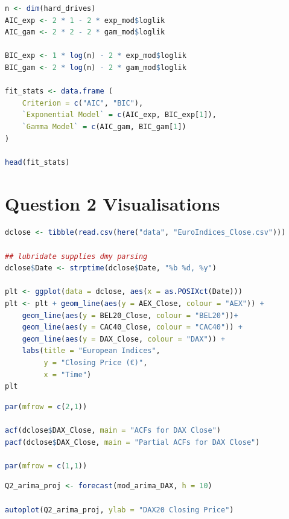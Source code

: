 \documentclass[a4paper]{article}
\begin{document}
\begin{lstlisting}[language=r,label=lst:org74350aa,caption={AIC and BIC information for models},captionpos=b,numbers=none]
n <- dim(hard_drives) 
AIC_exp <- 2 * 1 - 2 * exp_mod$loglik
AIC_gam <- 2 * 2 - 2 * gam_mod$loglik

BIC_exp <- 1 * log(n) - 2 * exp_mod$loglik
BIC_gam <- 2 * log(n) - 2 * gam_mod$loglik

fit_stats <- data.frame (
    Criterion = c("AIC", "BIC"),
    `Exponential Model` = c(AIC_exp, BIC_exp[1]),
    `Gamma Model` = c(AIC_gam, BIC_gam[1])
)

head(fit_stats)
\end{lstlisting}
\section{Question 2 Visualisations}
\label{sec:org46626dd}
\begin{lstlisting}[language=r,label=lst:org64127f7,caption={Time series plotting of European Indices data},captionpos=b,numbers=none]
dclose <- tibble(read.csv(here("data", "EuroIndices_Close.csv")))

## lubridate supplies dmy parsing
dclose$Date <- strptime(dclose$Date, "%b %d, %y")

plt <- ggplot(data = dclose, aes(x = as.POSIXct(Date)))
plt <- plt + geom_line(aes(y = AEX_Close, colour = "AEX")) +
    geom_line(aes(y = BEL20_Close, colour = "BEL20"))+
    geom_line(aes(y = CAC40_Close, colour = "CAC40")) +
    geom_line(aes(y = DAX_Close, colour = "DAX")) +
    labs(title = "European Indices",
         y = "Closing Price (€)",
         x = "Time")
plt
\end{lstlisting}

\begin{lstlisting}[language=r,label=lst:org18ff1d1,caption={Visualisation of ACFs and PACFs for DAX closing price},captionpos=b,numbers=none]
par(mfrow = c(2,1))

acf(dclose$DAX_Close, main = "ACFs for DAX Close")
pacf(dclose$DAX_Close, main = "Partial ACFs for DAX Close")

par(mfrow = c(1,1))
\end{lstlisting}

\begin{lstlisting}[language=r,label=lst:org605286c,caption={Predictions for DAX index from ARIMA model},captionpos=b,numbers=none]
Q2_arima_proj <- forecast(mod_arima_DAX, h = 10)

autoplot(Q2_arima_proj, ylab = "DAX20 Closing Price")
\end{lstlisting}
\end{document}
